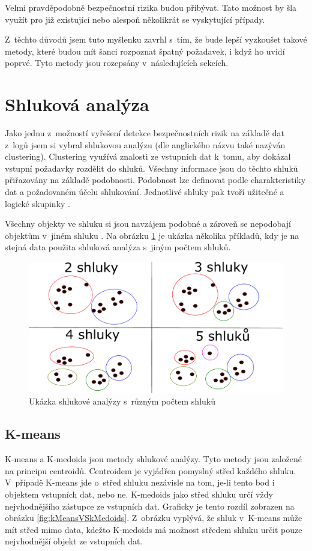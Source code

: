 \documentclass[thesis=M,czech]{FITthesis}[2012/10/20]
\newcommand{\tmpframe}[1]{\fbox{#1}}
\renewcommand{\tmpframe}[1]{#1}
\begin{document}
		Velmi pravděpodobně bezpečnostní rizika budou přibývat. Tato možnost by šla využít pro již existující nebo alespoň několikrát se vyskytující případy.
		
		Z~těchto důvodů jsem tuto myšlenku zavrhl s~tím, že bude lepší vyzkoušet takové metody, které budou mít šanci rozpoznat špatný požadavek, i když ho uvidí poprvé. Tyto metody jsou rozepsány v~následujících sekcích. 		
	
	\section{Shluková analýza}
		Jako jednu z~možností vyřešení detekce bezpečnostních rizik na základě dat z~logů jsem si vybral shlukovou analýzu (dle anglického názvu také nazýván clustering). Clustering využívá znalosti ze vstupních dat k~tomu, aby dokázal vstupní požadavky rozdělit do shluků. Všechny informace jsou do těchto shluků přiřazovány na základě podobnosti. Podobnost lze definovat podle charakteristiky dat a požadovaném účelu shlukování. Jednotlivé shluky pak tvoří užitečné a logické skupinky .
		
		Všechny objekty ve shluku si jsou navzájem podobné a zároveň se nepodobají objektům v~jiném shluku \cite{IntroductionToDataMining}. Na obrázku \ref{fig:clustering} je ukázka několika příkladů, kdy je na stejná data použita shluková analýza s~jiným počtem shluků.
		
		\begin{figure}[htb]\centering
			\tmpframe{\includegraphics[width=\textwidth]{./img/shlukova_anal}}		
			\caption{Ukázka shlukové analýzy s~různým počtem shluků}
			\label{fig:clustering}
		\end{figure}
		
		\subsection{K-means}
			K-means a K-medoids jsou metody shlukové analýzy. Tyto metody jsou založené na principu centroidů. Centroidem je vyjádřen pomyslný střed každého shluku. V~případě K-means jde o~střed shluku nezávisle na tom, je-li tento bod i objektem vstupních dat, nebo ne. K-medoids jako střed shluku určí vždy nejvhodnějšího zástupce ze vstupních dat. Graficky je tento rozdíl zobrazen na obrázku \ref{fig:kMeansVSkMedoids}. Z~obrázku vyplývá, že shluk v~K-means může mít střed mimo data, kdežto K-medoids má možnost středem shluku určit pouze nejvhodnější objekt ze vstupních dat.
			
\end{document}

